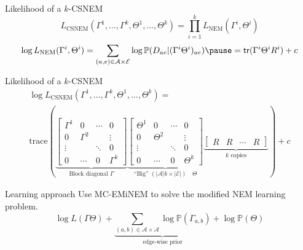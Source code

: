 \documentclass[aspectratio=169]{beamer}
\begin{document}
\begin{frame}{Likelihood of a $k$-CSNEM}
\[
L_\text{CSNEM}( \Gamma^1, \ldots, \Gamma^k, \Theta^1, \ldots, \Theta^k )
 = \prod_{i=1}^k L_\text{NEM}( \Gamma^i, \Theta^i ) \]
\pause
\[
\log L_\text{NEM}(\Gamma^i, \Theta^i) = \sum_{(a,e) \in \mathcal A \times \mathcal E} \log \mathbb P ( D_{ae} | (\Gamma^i \Theta^i)_{ae} ) \pause = \mathsf{tr} ( \Gamma^i \Theta^i R^i ) + c
\]
\end{frame}


\begin{frame}{Likelihood of a $k$-CSNEM}
\begin{multline*}
\log L_\text{CSNEM}( \Gamma^1, \ldots, \Gamma^k, \Theta^1, \ldots, \Theta^k )
 = \\ \text{trace}\left(
 \underbrace{\begin{bmatrix}
	\Gamma^1 & 0 & \cdots & 0 \\
	0 & \Gamma^2 & & \vdots \\
	\vdots & & \ddots & 0 \\
	0 & \cdots & 0 & \Gamma^k
 \end{bmatrix}}_{\text{Block diagonal } \Gamma}
 \underbrace{\begin{bmatrix}
	\Theta^1 & 0 & \cdots & 0 \\
	0 & \Theta^2 & & \vdots \\
	\vdots & & \ddots & 0 \\
	0 & \cdots & 0 & \Theta^k
 \end{bmatrix}}_{\text{``Big'' } (|\mathcal A|k \times |\mathcal E|)\quad \Theta}
 \underbrace{\begin{bmatrix}
	R & R & \cdots & R
 \end{bmatrix}}_{k \text{ copies}} \right) + c
\end{multline*}
\end{frame}

\begin{frame}{Learning approach}
Use MC-EMiNEM \parencite{niederberger2012mc} to solve the modified NEM learning problem.
\[
\log L( \Gamma \Theta ) + \underbrace{\sum_{(a,b) \in \mathcal A \times \mathcal A} \log \mathbb P(\Gamma_{a,b})}_{\text{edge-wise prior}} + \log \mathbb P( \Theta )
\]
\end{frame}


\end{document}

